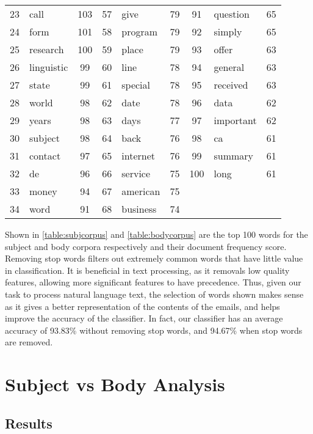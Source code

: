 \documentclass[10pt, a4paper]{article}
\begin{document}
\begin{table}[h!]
\begin{tabular}{|c|l|c||c|l|c||c|l|c|}
23 & call & 103 & 57 & give & 79 & 91 & question & 65 \\
24 & form & 101 & 58 & program & 79 & 92 & simply & 65 \\
25 & research & 100 & 59 & place & 79 & 93 & offer & 63 \\
26 & linguistic & 99 & 60 & line & 78 & 94 & general & 63 \\
27 & state & 99 & 61 & special & 78 & 95 & received & 63 \\
28 & world & 98 & 62 & date & 78 & 96 & data & 62 \\
29 & years & 98 & 63 & days & 77 & 97 & important & 62 \\
30 & subject & 98 & 64 & back & 76 & 98 & ca & 61 \\
31 & contact & 97 & 65 & internet & 76 & 99 & summary & 61 \\
32 & de & 96 & 66 & service & 75 & 100 & long & 61 \\
33 & money & 94 & 67 & american & 75 &  &  &  \\
34 & word & 91 & 68 & business & 74 &  &  &  \\
\hline
\end{tabular}
\label{table:bodycorpus}
\end{table}

Shown in \autoref{table:subjcorpus} and \autoref{table:bodycorpus} are the top 100 words for the subject and body corpora respectively and their document frequency score. Removing stop words filters out extremely common words that have little value in classification. It is beneficial in text processing, as it removals low quality features, allowing more significant features to have precedence. Thus, given our task to process natural language text, the selection of words shown makes sense as it gives a better representation of the contents of the emails, and helps improve the accuracy of the classifier. In fact, our classifier has an average accuracy of 93.83\% without removing stop words, and 94.67\% when stop words are removed.

\section{Subject vs Body Analysis}

\subsection{Results}
\end{document}
